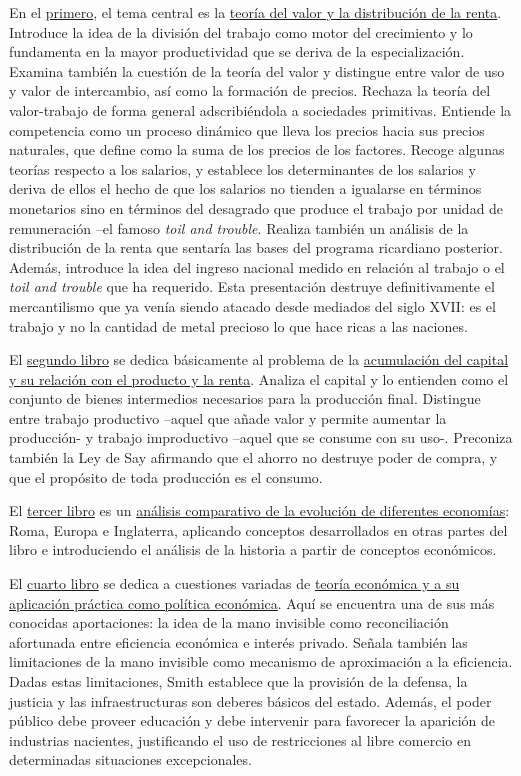 \documentclass{nuevotema}
\begin{document}
En el \underline{primero}, el tema central es la \underline{teoría del valor y la distribución de la renta}. Introduce la idea de la división del trabajo como motor del crecimiento y lo fundamenta en la mayor productividad que se deriva de la especialización. Examina también la cuestión de la teoría del valor y distingue entre valor de uso y valor de intercambio, así como la formación de precios. Rechaza la teoría del valor-trabajo de forma general adscribiéndola a sociedades primitivas. Entiende la competencia como un proceso dinámico que lleva los precios hacia sus precios naturales, que define como la suma de los precios de los factores. Recoge algunas teorías respecto a los salarios, y establece los determinantes de los salarios y deriva de ellos el hecho de que los salarios no tienden a igualarse en términos monetarios sino en términos del desagrado que produce el trabajo por unidad de remuneración --el famoso \textit{toil and trouble}. Realiza también un análisis de la distribución de la renta que sentaría las bases del programa ricardiano posterior. Además, introduce la idea del ingreso nacional medido en relación al trabajo o el \textit{toil and trouble} que ha requerido. Esta presentación destruye definitivamente el mercantilismo que ya venía siendo atacado desde mediados del siglo XVII: es el trabajo y no la cantidad de metal precioso lo que hace ricas a las naciones. 

El \underline{segundo libro} se dedica básicamente al problema de la \underline{acumulación del capital y su relación con el producto y la renta}. Analiza el capital y lo entienden como el conjunto de bienes intermedios necesarios para la producción final. Distingue entre trabajo productivo --aquel que añade valor y permite aumentar la producción- y trabajo improductivo --aquel que se consume con su uso-. Preconiza también la Ley de Say afirmando que el ahorro no destruye poder de compra, y que el propósito de toda producción es el consumo. 

El \underline{tercer libro} es un \underline{análisis comparativo de la evolución de diferentes economías}: Roma, Europa e Inglaterra, aplicando conceptos desarrollados en otras partes del libro e introduciendo el análisis de la historia a partir de conceptos económicos.

El \underline{cuarto libro} se dedica a cuestiones variadas de \underline{teoría económica y a su aplicación práctica como política económica}. Aquí se encuentra una de sus más conocidas aportaciones: la idea de la mano invisible como reconciliación afortunada entre eficiencia económica e interés privado. Señala también las limitaciones de la mano invisible como mecanismo de aproximación a la eficiencia. Dadas estas limitaciones, Smith establece que la provisión de la defensa, la justicia y las infraestructuras son deberes básicos del estado. Además, el poder público debe proveer educación y debe intervenir para favorecer la aparición de industrias nacientes, justificando el uso de restricciones al libre comercio en determinadas situaciones excepcionales.
\end{document}
